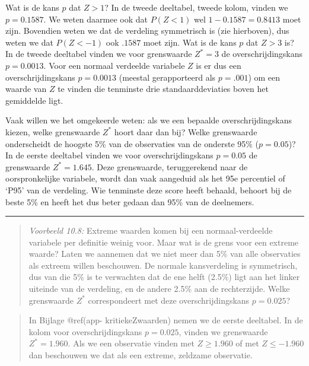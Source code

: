 \documentclass[
]{book}
\begin{document}
Wat is de kans \(p\) dat \(Z>1\)? In de tweede deeltabel, tweede kolom,
vinden we \(p=0.1587\). We weten daarmee ook dat \(P(Z<1)\) wel
\(1-0.1587=0.8413\) moet zijn. Bovendien weten we dat de verdeling
symmetrisch is (zie hierboven), dus weten we dat \(P(Z< -1)\) ook \(.1587\)
moet zijn. Wat is de kans \(p\) dat \(Z>3\) is? In de tweede deeltabel
vinden we voor grenswaarde \(Z^*=3\) de overschrijdingskans
\(p=0.0013\). Voor een normaal verdeelde variabele \(Z\) is er dus een
overschrijdingskans \(p=0.0013\) (meestal gerapporteerd als \(p=.001\)) om een waarde van \(Z\) te vinden die
tenminste drie standaarddeviaties boven het gemiddelde ligt.

Vaak willen we het omgekeerde weten: als we een bepaalde
overschrijdingskans kiezen, welke grenswaarde \(Z^*\) hoort daar dan bij?
Welke grenswaarde onderscheidt de hoogste 5\% van de observaties van de
onderste 95\% (\(p=0.05\))? In de eerste deeltabel vinden we
voor overschrijdingskans \(p=0.05\) de grenswaarde \(Z^*=1.645\). Deze
grenswaarde, teruggerekend naar de oorspronkelijke variabele, wordt dan
vaak aangeduid als het 95e percentiel of `P95' van de verdeling. Wie
tenminste deze score heeft behaald, behoort bij de beste 5\% en heeft het dus
beter gedaan dan 95\% van de deelnemers.

\begin{center}\rule{0.5\linewidth}{0.5pt}\end{center}

\begin{quote}
\emph{Voorbeeld 10.8:}
Extreme waarden komen bij een normaal-verdeelde variabele per definitie
weinig voor. Maar wat is de grens voor een extreme waarde? Laten we
aannemen dat we niet meer dan 5\% van alle observaties als extreem willen
beschouwen. De normale kansverdeling is symmetrisch, dus van die 5\% is
te verwachten dat de ene helft (2.5\%) ligt aan het linker uiteinde van
de verdeling, en de andere 2.5\% aan de rechterzijde. Welke grenswaarde
\(Z^*\) correspondeert met deze overschrijdingskans \(p=0.025\)?
\end{quote}

\begin{quote}
In Bijlage @ref(app- kritiekeZwaarden) nemen we de eerste deeltabel. In de kolom
voor overschrijdingskans \(p=0.025\), vinden we grenswaarde
\(Z^*=1.960\). Als we een observatie vinden met \(Z \ge 1.960\) of met
\(Z \le -1.960\) dan beschouwen we dat als een extreme, zeldzame
observatie.
\end{quote}
\end{document}
